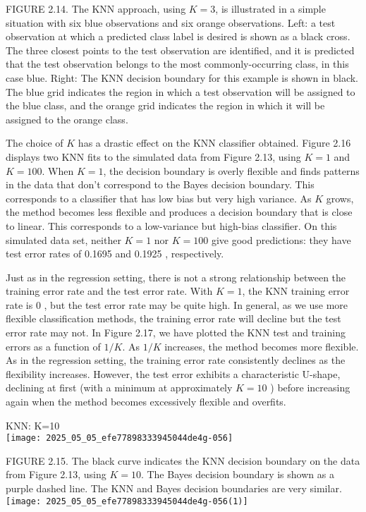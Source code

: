 \documentclass[10pt]{article}
\begin{document}
FIGURE 2.14. The KNN approach, using $K=3$, is illustrated in a simple situation with six blue observations and six orange observations. Left: a test observation at which a predicted class label is desired is shown as a black cross. The three closest points to the test observation are identified, and it is predicted that the test observation belongs to the most commonly-occurring class, in this case blue. Right: The KNN decision boundary for this example is shown in black. The blue grid indicates the region in which a test observation will be assigned to the blue class, and the orange grid indicates the region in which it will be assigned to the orange class.

The choice of $K$ has a drastic effect on the KNN classifier obtained. Figure 2.16 displays two KNN fits to the simulated data from Figure 2.13, using $K=1$ and $K=100$. When $K=1$, the decision boundary is overly flexible and finds patterns in the data that don't correspond to the Bayes decision boundary. This corresponds to a classifier that has low bias but very high variance. As $K$ grows, the method becomes less flexible and produces a decision boundary that is close to linear. This corresponds to a low-variance but high-bias classifier. On this simulated data set, neither $K=1$ nor $K=100$ give good predictions: they have test error rates of 0.1695 and 0.1925 , respectively.

Just as in the regression setting, there is not a strong relationship between the training error rate and the test error rate. With $K=1$, the KNN training error rate is 0 , but the test error rate may be quite high. In general, as we use more flexible classification methods, the training error rate will decline but the test error rate may not. In Figure 2.17, we have plotted the KNN test and training errors as a function of $1 / K$. As $1 / K$ increases, the method becomes more flexible. As in the regression setting, the training error rate consistently declines as the flexibility increases. However, the test error exhibits a characteristic U-shape, declining at first (with a minimum at approximately $K=10$ ) before increasing again when the method becomes excessively flexible and overfits.


KNN: K=10\\
\texttt{[image: 2025\_05\_05\_efe77898333945044de4g-056]}

FIGURE 2.15. The black curve indicates the KNN decision boundary on the data from Figure 2.13, using $K=10$. The Bayes decision boundary is shown as a purple dashed line. The KNN and Bayes decision boundaries are very similar.\\
\texttt{[image: 2025\_05\_05\_efe77898333945044de4g-056(1)]}
\end{document}
